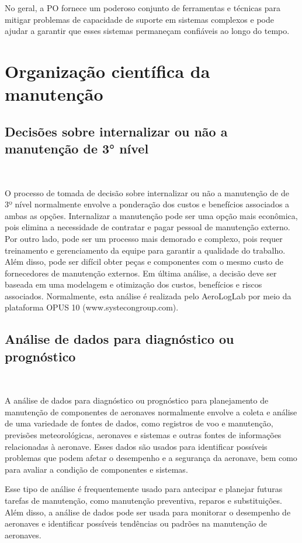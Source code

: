 \documentclass{article}
\begin{document}
No geral, a PO fornece um poderoso conjunto de ferramentas e técnicas para mitigar problemas de capacidade de suporte em sistemas complexos e pode ajudar a garantir que esses sistemas permaneçam confiáveis ao longo do tempo.


\section{Organização científica da manutenção}


\subsection{Decisões sobre internalizar ou não a manutenção de 3° nível}\

O processo de tomada de decisão sobre internalizar ou não a manutenção de de 3º nível normalmente envolve a ponderação dos custos e benefícios associados a ambas as opções. Internalizar a manutenção pode ser uma opção mais econômica, pois elimina a necessidade de contratar e pagar pessoal de manutenção externo. Por outro lado, pode ser um processo mais demorado e complexo, pois requer treinamento e gerenciamento da equipe para garantir a qualidade do trabalho. Além disso, pode ser difícil obter peças e componentes com o mesmo custo de fornecedores de manutenção externos. Em última análise, a decisão deve ser baseada em uma modelagem e otimização dos custos, benefícios e riscos associados.
Normalmente, esta análise é realizada pelo AeroLogLab por meio da plataforma OPUS 10 (www.systecongroup.com).

\subsection{Análise de dados para diagnóstico ou prognóstico}\

A análise de dados para diagnóstico ou prognóstico para planejamento de manutenção de componentes de aeronaves normalmente envolve a coleta e análise de uma variedade de fontes de dados, como registros de voo e manutenção, previsões meteorológicas, aeronaves e sistemas e outras fontes de informações relacionadas à aeronave. Esses dados são usados para identificar possíveis problemas que podem afetar o desempenho e a segurança da aeronave, bem como para avaliar a condição de componentes e sistemas.

Esse tipo de análise é frequentemente usado para antecipar e planejar futuras tarefas de manutenção, como manutenção preventiva, reparos e substituições. Além disso, a análise de dados pode ser usada para monitorar o desempenho de aeronaves e identificar possíveis tendências ou padrões na manutenção de aeronaves.
\end{document}
